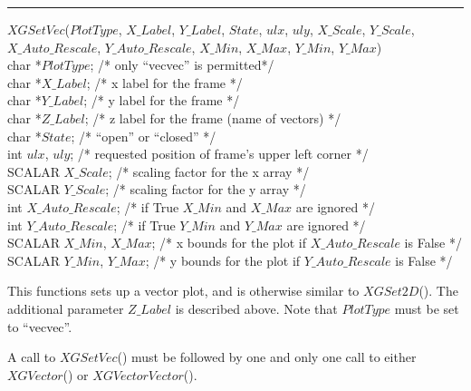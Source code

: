 \def\xlen{4in}
\begin{minipage}{\xlen}
\begin{flushright}
\rule{\xlen}{.5pt}
\end{flushright}
\end{minipage}

\begin{flushleft}
$XGSetVec$($PlotType$, $X\_Label$, $Y\_Label$, $State$, $ulx$, $uly$, $X\_Scale$, $Y\_Scale$, \\
\hspace{.8in} $X\_Auto\_Rescale$, $Y\_Auto\_Rescale$, $X\_Min$, $X\_Max$, $Y\_Min$, $Y\_Max$) \\
char  *$PlotType$;         /* only ``vecvec'' is permitted*/ \\
char  *$X\_Label$;         /* x label for the frame                            */ \\
char  *$Y\_Label$;         /* y label for the frame
*/ \\
char  *$Z\_Label$;           /* z label for the frame (name of vectors)                            */ \\
char  *$State$;            /* ``open'' or ``closed''                           */ \\
int    $ulx$, $uly$;       /* requested position of frame's upper left corner   */ \\
SCALAR  $X\_Scale$;         /* scaling factor for the x array                   */ \\
SCALAR  $Y\_Scale$;         /* scaling factor for the y array                   */ \\
int    $X\_Auto\_Rescale$; /* if True $X\_Min$ and $X\_Max$ are ignored       */ \\
int    $Y\_Auto\_Rescale$; /* if True $Y\_Min$ and $Y\_Max$ are ignored       */ \\
SCALAR  $X\_Min$, $X\_Max$; /* x bounds for the plot if $X\_Auto\_Rescale$ is False  */ \\
SCALAR  $Y\_Min$, $Y\_Max$; /* y bounds for the plot if $Y\_Auto\_Rescale$ is False  */ 
\end{flushleft}

This functions sets up a vector plot, and is otherwise similar to
$XGSet2D$().  The additional parameter $Z\_Label$ is described above.
Note that $PlotType$ must be set to ``vecvec''.

A call to $XGSetVec$() must be followed by one and only one call to either
$XGVector$() or $XGVectorVector$().

